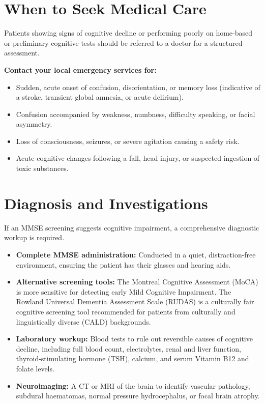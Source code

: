 \section*{When to Seek Medical Care}
Patients showing signs of cognitive decline or performing poorly on home-based or preliminary cognitive tests should be referred to a doctor for a structured assessment.

\textbf{Contact your local emergency services for:}
\begin{itemize}
    \item Sudden, acute onset of confusion, disorientation, or memory loss (indicative of a stroke, transient global amnesia, or acute delirium).
    \item Confusion accompanied by weakness, numbness, difficulty speaking, or facial asymmetry.
    \item Loss of consciousness, seizures, or severe agitation causing a safety risk.
    \item Acute cognitive changes following a fall, head injury, or suspected ingestion of toxic substances.
\end{itemize}

\section*{Diagnosis and Investigations}
If an MMSE screening suggests cognitive impairment, a comprehensive diagnostic workup is required.
\begin{itemize}
    \item \textbf{Complete MMSE administration:} Conducted in a quiet, distraction-free environment, ensuring the patient has their glasses and hearing aids.
    \item \textbf{Alternative screening tools:} The Montreal Cognitive Assessment (MoCA) is more sensitive for detecting early Mild Cognitive Impairment. The Rowland Universal Dementia Assessment Scale (RUDAS) is a culturally fair cognitive screening tool recommended for patients from culturally and linguistically diverse (CALD) backgrounds.
    \item \textbf{Laboratory workup:} Blood tests to rule out reversible causes of cognitive decline, including full blood count, electrolytes, renal and liver function, thyroid-stimulating hormone (TSH), calcium, and serum Vitamin B12 and folate levels.
    \item \textbf{Neuroimaging:} A CT or MRI of the brain to identify vascular pathology, subdural haematomas, normal pressure hydrocephalus, or focal brain atrophy.
\end{itemize}

